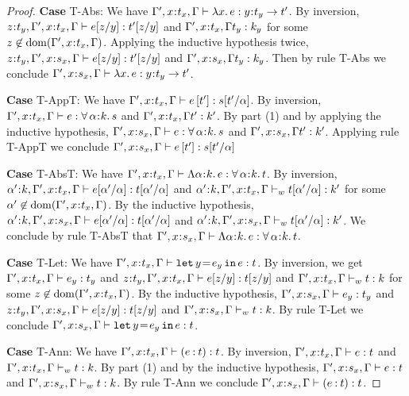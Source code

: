 \documentclass[11pt]{article}
\newcommand{\al}{\alpha}
\newcommand{\bind}{\hspace{0.05em}{:}\hspace{0.05em}} %
\newcommand{\col}{\mathbin{:}}       %
\newcommand{\polytype}[3]{\forall\, #1\bind #2.\, #3}
\newcommand{\functype}[3]{#1\bind #2 \rightarrow #3}
\newcommand{\letin}[3]{{\tt let}\,#1\hspace{0.1em}{=}\hspace{0.1em}#2\,{\tt in}\,#3}
\newcommand{\dom}[1]{{\rm dom}(#1)}
\begin{document}
\begin{proof}
{\bf Case} {\sc T-Abs}: We have $\Gamma', x\bind t_x, \Gamma \vdash \lambda x.\, e : \functype{y}{t_y}{t'}$. By inversion, 
$z\bind t_y, \Gamma', x\bind t_x, \Gamma \vdash e[z/y] : t'[z/y]$ and $\Gamma', x\bind t_x, \Gamma t_y : k_y$ for some $z\not\in\dom{\Gamma', x\bind t_x, \Gamma}$. Applying the inductive hypothesis twice, $z\bind t_y, \Gamma', x\bind s_x, \Gamma \vdash e[z/y] : t'[z/y]$ and $\Gamma', x\bind s_x, \Gamma t_y : k_y$. Then by rule {\sc T-Abs} we conclude $\Gamma', x\bind s_x, \Gamma \vdash \lambda x.\, e : \functype{y}{t_y}{t'}$.

{\bf Case} {\sc T-AppT}: We have $\Gamma', x\bind t_x, \Gamma \vdash e\,[t'] : s[t'/\al]$. By inversion, $\Gamma', x\bind t_x, \Gamma \vdash e : \polytype{\al}{k}{s}$ and $\Gamma', x\bind t_x, \Gamma t' : k'$. By part (1) and by applying the inductive hypothesis, $\Gamma', x\bind s_x, \Gamma \vdash e : \polytype{\al}{k}{s}$ and $\Gamma', x\bind s_x, \Gamma t' : k'$. Applying rule {\sc T-AppT} we conclude $\Gamma', x\bind s_x, \Gamma \vdash e\,[t'] : s[t'/\al]$

{\bf Case} {\sc T-AbsT}: We have $\Gamma', x\bind t_x, \Gamma \vdash \Lambda\al\bind k.\,e : \polytype{\al}{k}{t}$. By inversion, $\al'\bind k,\Gamma', x\bind t_x, \Gamma \vdash e[\al'/\al] : t[\al'/\al]$ and $\al'\bind k,\Gamma', x\bind t_x, \Gamma \vdash_w t[\al'/\al] : k'$ for some $\al'\not\in\dom{\Gamma', x\bind t_x, \Gamma}$. By the inductive hypothesis, $\al'\bind k,\Gamma', x\bind s_x, \Gamma \vdash e[\al'/\al] : t[\al'/\al]$ and $\al'\bind k,\Gamma', x\bind s_x, \Gamma \vdash_w t[\al'/\al] : k'$. We conclude by rule {\sc T-AbsT} that $\Gamma', x\bind s_x, \Gamma \vdash \Lambda\al\bind k.\,e : \polytype{\al}{k}{t}$.

{\bf Case} {\sc T-Let}: We have $\Gamma', x\bind t_x, \Gamma \vdash \letin{y}{e_y}{e} : t$. By inversion, we get $\Gamma', x\bind t_x, \Gamma \vdash e_y : t_y$ and $z\bind t_y,\Gamma', x\bind t_x, \Gamma \vdash e[z/y] : t[z/y]$ and $\Gamma', x\bind t_x, \Gamma \vdash_w t : k$ for some $z\not\in\dom{\Gamma', x\bind t_x, \Gamma}$. By the inductive hypothesis, $\Gamma', x\bind s_x, \Gamma \vdash e_y : t_y$ and $z\bind t_y,\Gamma', x\bind s_x, \Gamma \vdash e[z/y] : t[z/y]$ and $\Gamma', x\bind s_x, \Gamma \vdash_w t : k$. By rule {\sc T-Let} we conclude $\Gamma', x\bind s_x, \Gamma \vdash \letin{y}{e_y}{e} : t$.

{\bf Case} {\sc T-Ann}: We have $\Gamma', x\bind t_x, \Gamma \vdash (e\col t) : t$. By inversion, $\Gamma', x\bind t_x, \Gamma \vdash e: t$ and $\Gamma', x\bind t_x, \Gamma \vdash_w t : k$. By part (1) and by the inductive hypothesis, $\Gamma', x\bind s_x, \Gamma \vdash e: t$ and $\Gamma', x\bind s_x, \Gamma \vdash_w t : k$. By rule {\sc T-Ann} we conclude $\Gamma', x\bind s_x, \Gamma \vdash (e\col t) : t$.


\end{proof}
\end{document}
